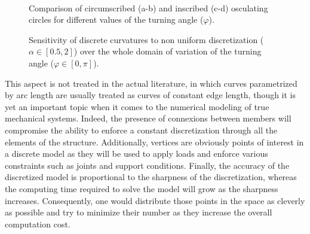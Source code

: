 \begin{figure}[!p]
	\captionsetup[subfloat]{captionskip=10pt}
	\centering
	\vspace{-5mm}
	\hspace{5mm}
	 \\[-10mm]
	\hspace{5mm}
	\caption{Comparison of circumscribed (a-b) and inscribed (c-d) osculating circles for different values of the turning angle ($\varphi$).}
	\label{fig:kb_animation}
	\vspace{10mm}
	
	\caption{Sensitivity of discrete curvatures to non uniform discretization ($\alpha \in [0.5,2]$) over the whole domain of variation of the turning angle ($\varphi \in [0,\pi]$).}
	\label{fig:kb_bench}
\end{figure}

This aspect is not treated in the actual literature, in which curves parametrized by arc length are usually treated as curves of constant edge length, though it is yet an important topic when it comes to the numerical modeling of true mechanical systems. Indeed, the presence of connexions between members will compromise the ability to enforce a constant discretization through all the elements of the structure. Additionally, vertices are obviously points of interest in a discrete model as they will be used to apply loads and enforce various constraints such as joints and support conditions. Finally, the accuracy of the discretized model is proportional to the sharpness of the discretization, whereas the computing time required to solve the model will grow as the sharpness increases. Consequently, one would distribute those points in the space as cleverly as possible and try to minimize their number as they increase the overall computation cost.

